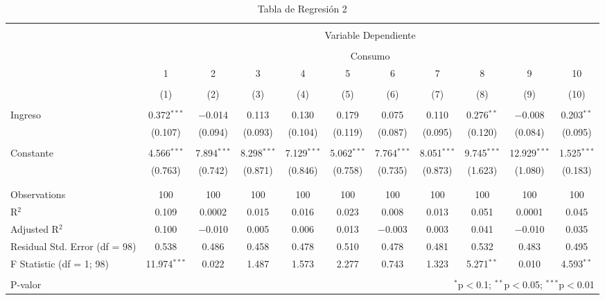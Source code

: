 \documentclass[
]{article}
\begin{document}
\newpage
\begin{landscape}


\begin{table}[!htbp] \centering 
  \caption{Tabla de Regresión 2} 
  \label{} 
\footnotesize 
\begin{tabular}{@{\extracolsep{5pt}}lcccccccccc} 
\\[-1.8ex]\hline 
\hline \\[-1.8ex] 
 & \multicolumn{10}{c}{Variable Dependiente} \\ 
\cline{2-11} 
\\[-1.8ex] & \multicolumn{10}{c}{Consumo} \\ 
 & 1 & 2 & 3 & 4 & 5 & 6 & 7 & 8 & 9 & 10 \\ 
\\[-1.8ex] & (1) & (2) & (3) & (4) & (5) & (6) & (7) & (8) & (9) & (10)\\ 
\hline \\[-1.8ex] 
 Ingreso & 0.372$^{***}$ & $-$0.014 & 0.113 & 0.130 & 0.179 & 0.075 & 0.110 & 0.276$^{**}$ & $-$0.008 & 0.203$^{**}$ \\ 
  & (0.107) & (0.094) & (0.093) & (0.104) & (0.119) & (0.087) & (0.095) & (0.120) & (0.084) & (0.095) \\ 
  & & & & & & & & & & \\ 
 Constante & 4.566$^{***}$ & 7.894$^{***}$ & 8.298$^{***}$ & 7.129$^{***}$ & 5.062$^{***}$ & 7.764$^{***}$ & 8.051$^{***}$ & 9.745$^{***}$ & 12.929$^{***}$ & 1.525$^{***}$ \\ 
  & (0.763) & (0.742) & (0.871) & (0.846) & (0.758) & (0.735) & (0.873) & (1.623) & (1.080) & (0.183) \\ 
  & & & & & & & & & & \\ 
\hline \\[-1.8ex] 
Observations & 100 & 100 & 100 & 100 & 100 & 100 & 100 & 100 & 100 & 100 \\ 
R$^{2}$ & 0.109 & 0.0002 & 0.015 & 0.016 & 0.023 & 0.008 & 0.013 & 0.051 & 0.0001 & 0.045 \\ 
Adjusted R$^{2}$ & 0.100 & $-$0.010 & 0.005 & 0.006 & 0.013 & $-$0.003 & 0.003 & 0.041 & $-$0.010 & 0.035 \\ 
Residual Std. Error (df = 98) & 0.538 & 0.486 & 0.458 & 0.478 & 0.510 & 0.478 & 0.481 & 0.532 & 0.483 & 0.495 \\ 
F Statistic (df = 1; 98) & 11.974$^{***}$ & 0.022 & 1.487 & 1.573 & 2.277 & 0.743 & 1.323 & 5.271$^{**}$ & 0.010 & 4.593$^{**}$ \\ 
\hline 
\hline \\[-1.8ex] 
P-valor & \multicolumn{10}{r}{$^{*}$p$<$0.1; $^{**}$p$<$0.05; $^{***}$p$<$0.01} \\ 
\end{tabular} 
\end{table} 


\end{landscape}
\end{document}
